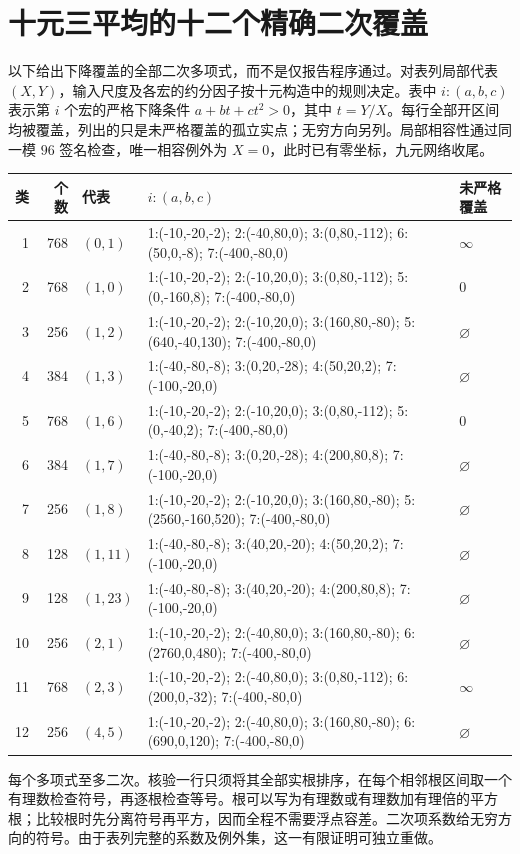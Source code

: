 \documentclass[11pt,a4paper]{article}
\theoremstyle{definition}
\numberwithin{equation}{section}
\begin{document}
\section{十元三平均的十二个精确二次覆盖}\label{sec:ten-cover}
以下给出下降覆盖的全部二次多项式，而不是仅报告程序通过。对表列局部代表 $(X,Y)$，输入尺度及各宏的约分因子按十元构造中的规则决定。表中 $i:(a,b,c)$ 表示第 $i$ 个宏的严格下降条件 $a+bt+ct^2>0$，其中 $t=Y/X$。每行全部开区间均被覆盖，列出的只是未严格覆盖的孤立实点；无穷方向另列。局部相容性通过同一模 $96$ 签名检查，唯一相容例外为 $X=0$，此时已有零坐标，九元网络收尾。
\small\begin{longtable}{r r l p{83mm} p{24mm}}
\toprule 类&个数&代表&$i:(a,b,c)$&未严格覆盖\\\midrule\endhead
1&768&$(0,1)$&1:(-10,-20,-2); 2:(-40,80,0); 3:(0,80,-112); 6:(50,0,-8); 7:(-400,-80,0)&$\infty$\\
2&768&$(1,0)$&1:(-10,-20,-2); 2:(-10,20,0); 3:(0,80,-112); 5:(0,-160,8); 7:(-400,-80,0)&0\\
3&256&$(1,2)$&1:(-10,-20,-2); 2:(-10,20,0); 3:(160,80,-80); 5:(640,-40,130); 7:(-400,-80,0)&$\varnothing$\\
4&384&$(1,3)$&1:(-40,-80,-8); 3:(0,20,-28); 4:(50,20,2); 7:(-100,-20,0)&$\varnothing$\\
5&768&$(1,6)$&1:(-10,-20,-2); 2:(-10,20,0); 3:(0,80,-112); 5:(0,-40,2); 7:(-400,-80,0)&0\\
6&384&$(1,7)$&1:(-40,-80,-8); 3:(0,20,-28); 4:(200,80,8); 7:(-100,-20,0)&$\varnothing$\\
7&256&$(1,8)$&1:(-10,-20,-2); 2:(-10,20,0); 3:(160,80,-80); 5:(2560,-160,520); 7:(-400,-80,0)&$\varnothing$\\
8&128&$(1,11)$&1:(-40,-80,-8); 3:(40,20,-20); 4:(50,20,2); 7:(-100,-20,0)&$\varnothing$\\
9&128&$(1,23)$&1:(-40,-80,-8); 3:(40,20,-20); 4:(200,80,8); 7:(-100,-20,0)&$\varnothing$\\
10&256&$(2,1)$&1:(-10,-20,-2); 2:(-40,80,0); 3:(160,80,-80); 6:(2760,0,480); 7:(-400,-80,0)&$\varnothing$\\
11&768&$(2,3)$&1:(-10,-20,-2); 2:(-40,80,0); 3:(0,80,-112); 6:(200,0,-32); 7:(-400,-80,0)&$\infty$\\
12&256&$(4,5)$&1:(-10,-20,-2); 2:(-40,80,0); 3:(160,80,-80); 6:(690,0,120); 7:(-400,-80,0)&$\varnothing$\\
\bottomrule\end{longtable}\normalsize
每个多项式至多二次。核验一行只须将其全部实根排序，在每个相邻根区间取一个有理数检查符号，再逐根检查等号。根可以写为有理数或有理数加有理倍的平方根；比较根时先分离符号再平方，因而全程不需要浮点容差。二次项系数给无穷方向的符号。由于表列完整的系数及例外集，这一有限证明可独立重做。
\end{document}
